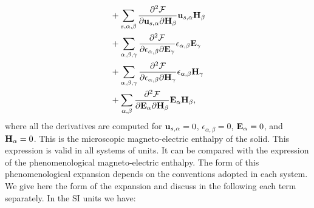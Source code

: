 \documentclass[12pt,a4paper,twoside]{report}
\begin{document}
\begin{align}
&+ \sum_{s,\alpha,\beta} {\partial^2 \mathcal{F} \over \partial 
{\bf u}_{s,\alpha} \partial {\bf H}_{\beta}} {\bf u}_{s,\alpha}
{\bf H}_{\beta} \nonumber \\
&+ \sum_{\alpha,\beta,\gamma} {\partial^2 \mathcal{F} \over \partial 
\epsilon_{\alpha,\beta} \partial {\bf E}_{\gamma}} \epsilon_{\alpha,\beta}
{\bf E}_{\gamma} \nonumber \\
&+ \sum_{\alpha,\beta,\gamma} {\partial^2 \mathcal{F} \over \partial 
\epsilon_{\alpha,\beta} \partial {\bf H}_{\gamma}} \epsilon_{\alpha,\beta}
{\bf H}_{\gamma} \nonumber \\
&+ \sum_{\alpha,\beta} {\partial^2 \mathcal{F} \over \partial 
{\bf E}_{\alpha} \partial {\bf H}_{\beta}} {\bf E}_{\alpha}
{\bf H}_{\beta},
\end{align}
where all the derivatives are computed for ${\bf u}_{s,\alpha}=0$,
$\epsilon_{\alpha,\beta}=0$, ${\bf E}_\alpha=0$, and ${\bf H}_\alpha=0$.
\newpage
This is the microscopic magneto-electric enthalpy of the solid. This 
expression is valid in all systems of units. It can be compared with 
the expression of the 
phenomenological magneto-electric enthalpy. The form of this phenomenological
expansion depends on the conventions adopted in each system. We give here the
form of the expansion and discuss in the following each term separately.
In the SI units we have:
\end{document}
